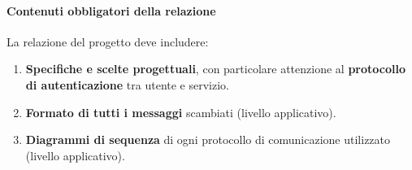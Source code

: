 \paragraph{Contenuti obbligatori della relazione}
La relazione del progetto deve includere:
\begin{enumerate}
  \item \textbf{Specifiche e scelte progettuali}, con particolare attenzione al \textbf{protocollo di autenticazione} tra utente e servizio.
  \item \textbf{Formato di tutti i messaggi} scambiati (livello applicativo).
  \item \textbf{Diagrammi di sequenza} di ogni protocollo di comunicazione utilizzato (livello applicativo).
\end{enumerate}
